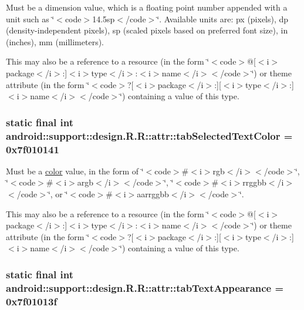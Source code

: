 Must be a dimension value, which is a floating point number appended with a unit such as \char`\"{}$<$code$>$14.5sp$<$/code$>$\char`\"{}. Available units are: px (pixels), dp (density-independent pixels), sp (scaled pixels based on preferred font size), in (inches), mm (millimeters). 

This may also be a reference to a resource (in the form \char`\"{}$<$code$>$@\mbox{[}$<$i$>$package$<$/i$>$:\mbox{]}$<$i$>$type$<$/i$>$:$<$i$>$name$<$/i$>$$<$/code$>$\char`\"{}) or theme attribute (in the form \char`\"{}$<$code$>$?\mbox{[}$<$i$>$package$<$/i$>$:\mbox{]}\mbox{[}$<$i$>$type$<$/i$>$:\mbox{]}$<$i$>$name$<$/i$>$$<$/code$>$\char`\"{}) containing a value of this type. \hypertarget{classandroid_1_1support_1_1design_1_1_r_1_1attr_dd80ee29b592b703e01fc7233c564942}{
\subsubsection[{tabSelectedTextColor}]{\setlength{\rightskip}{0pt plus 5cm}static final int android::support::design.R.R::attr::tabSelectedTextColor = 0x7f010141}}
\label{classandroid_1_1support_1_1design_1_1_r_1_1attr_dd80ee29b592b703e01fc7233c564942}


Must be a \hyperlink{classandroid_1_1support_1_1design_1_1_r_1_1color}{color} value, in the form of \char`\"{}$<$code$>$\#$<$i$>$rgb$<$/i$>$$<$/code$>$\char`\"{}, \char`\"{}$<$code$>$\#$<$i$>$argb$<$/i$>$$<$/code$>$\char`\"{}, \char`\"{}$<$code$>$\#$<$i$>$rrggbb$<$/i$>$$<$/code$>$\char`\"{}, or \char`\"{}$<$code$>$\#$<$i$>$aarrggbb$<$/i$>$$<$/code$>$\char`\"{}. 

This may also be a reference to a resource (in the form \char`\"{}$<$code$>$@\mbox{[}$<$i$>$package$<$/i$>$:\mbox{]}$<$i$>$type$<$/i$>$:$<$i$>$name$<$/i$>$$<$/code$>$\char`\"{}) or theme attribute (in the form \char`\"{}$<$code$>$?\mbox{[}$<$i$>$package$<$/i$>$:\mbox{]}\mbox{[}$<$i$>$type$<$/i$>$:\mbox{]}$<$i$>$name$<$/i$>$$<$/code$>$\char`\"{}) containing a value of this type. \hypertarget{classandroid_1_1support_1_1design_1_1_r_1_1attr_2c603a254c0dde3f9b3d841dc8a991f1}{
\subsubsection[{tabTextAppearance}]{\setlength{\rightskip}{0pt plus 5cm}static final int android::support::design.R.R::attr::tabTextAppearance = 0x7f01013f}}
\label{classandroid_1_1support_1_1design_1_1_r_1_1attr_2c603a254c0dde3f9b3d841dc8a991f1}


